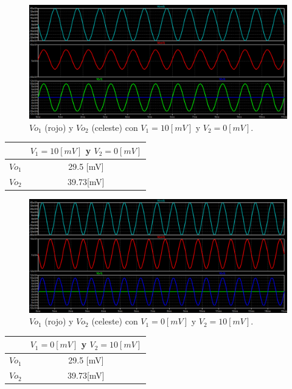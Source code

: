 \begin{figure}[H]
	\centering
	\includegraphics[width=1\textwidth]{figuras/Sim_V1=10mv_V2=0.png}
	\caption{$Vo_1$ (rojo) y $Vo_2$ (celeste) con $V_1=10[mV]$ y $V_2=0[mV]$.}
\end{figure}
\begin{center}
	\begin{tabular}{| c | c |}
		\hline
		& $V_1=10[mV]$ y $V_2=0[mV]$ \\ \hline
		$Vo_1$ 	&  	29.5 [mV]	 \\
		$Vo_2$ 	& 	39.73[mV]	 \\ \hline
	\end{tabular}
\end{center}

\begin{figure}[H]
	\centering
	\includegraphics[width=1\textwidth]{figuras/Sim_V1=0_V2=10mv.png}
	\caption{$Vo_1$ (rojo) y $Vo_2$ (celeste) con $V_1=0[mV]$ y $V_2=10[mV]$.}
\end{figure}
\begin{center}
	\begin{tabular}{| c | c |}
		\hline
		& $V_1=0[mV]$ y $V_2=10[mV]$ \\ \hline
		$Vo_1$ 	&  	29.5 [mV]	 \\
		$Vo_2$ 	& 	39.73[mV]	 \\ \hline
	\end{tabular}
\end{center}

